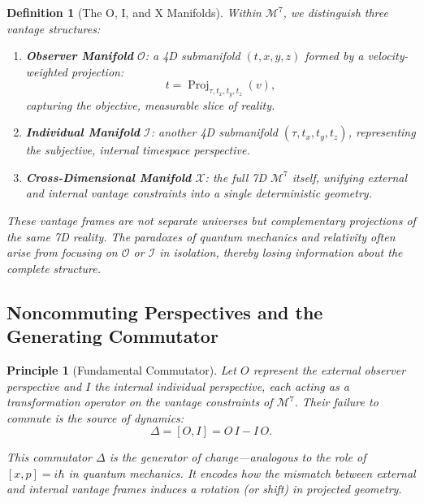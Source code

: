 \documentclass{article}
\newtheorem{definition}{Definition}
\newtheorem{principle}{Principle}
\DeclareMathOperator{\Proj}{Proj}
\begin{document}
\begin{definition}[The O, I, and X Manifolds]
Within $\mathcal{M}^7$, we distinguish three vantage structures:
\begin{enumerate}
  \item \textbf{Observer Manifold} $\mathcal{O}$: a 4D submanifold $(t, x, y, z)$ formed by a velocity-weighted projection:
  \begin{equation}
  t = \Proj_{\tau, t_x, t_y, t_z}(v),
  \end{equation}
  capturing the objective, measurable slice of reality.

  \item \textbf{Individual Manifold} $\mathcal{I}$: another 4D submanifold $(\tau, t_x, t_y, t_z)$, representing the subjective, internal timespace perspective.

  \item \textbf{Cross-Dimensional Manifold} $\mathcal{X}$: the full 7D $\mathcal{M}^7$ itself, unifying external and internal vantage constraints into a single deterministic geometry.
\end{enumerate}

These vantage frames are \emph{not} separate universes but complementary projections of the same 7D reality. The paradoxes of quantum mechanics and relativity often arise from focusing on $\mathcal{O}$ or $\mathcal{I}$ in isolation, thereby losing information about the complete structure.
\end{definition}

\subsection*{Noncommuting Perspectives and the Generating Commutator}

\begin{principle}[Fundamental Commutator]
Let $O$ represent the external observer perspective and $I$ the internal individual perspective, each acting as a \emph{transformation operator} on the vantage constraints of $\mathcal{M}^7$. Their failure to commute is the source of dynamics:
\begin{equation}
\Delta = [O, I] = O\,I - I\,O.
\end{equation}

This commutator $\Delta$ is the generator of change---analogous to the role of $[x,p] = i\hbar$ in quantum mechanics. It encodes how the mismatch between external and internal vantage frames induces a \emph{rotation} (or shift) in projected geometry.
\end{principle}
\end{document}
